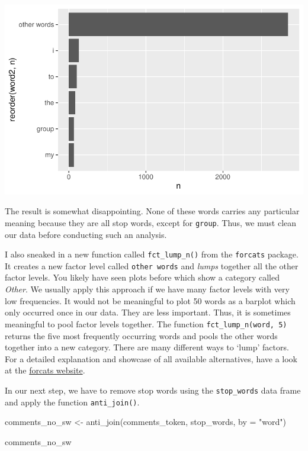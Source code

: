 \documentclass[
  letterpaper,
  DIV=11,
  numbers=noendperiod]{scrreprt}
\newenvironment{Shaded}{\begin{snugshade}}{\end{snugshade}}
\newcommand{\AttributeTok}[1]{\textcolor[rgb]{0.40,0.45,0.13}{#1}}
\newcommand{\FunctionTok}[1]{\textcolor[rgb]{0.28,0.35,0.67}{#1}}
\newcommand{\NormalTok}[1]{\textcolor[rgb]{0.00,0.23,0.31}{#1}}
\newcommand{\OtherTok}[1]{\textcolor[rgb]{0.00,0.23,0.31}{#1}}
\newcommand{\StringTok}[1]{\textcolor[rgb]{0.13,0.47,0.30}{#1}}
\begin{document}
\includegraphics{14_mixed_methods_files/figure-pdf/freq-words-before-stopwords-removal-1.pdf}

The result is somewhat disappointing. None of these words carries any
particular meaning because they are all stop words, except for
\texttt{group}. Thus, we must clean our data before conducting such an
analysis.

I also sneaked in a new function called \texttt{fct\_lump\_n()} from the
\texttt{forcats} package. It creates a new factor level called
\texttt{other\ words} and \emph{lumps} together all the other factor
levels. You likely have seen plots before which show a category called
\emph{Other}. We usually apply this approach if we have many factor
levels with very low frequencies. It would not be meaningful to plot 50
words as a barplot which only occurred once in our data. They are less
important. Thus, it is sometimes meaningful to pool factor levels
together. The function \texttt{fct\_lump\_n(word,\ 5)} returns the five
most frequently occurring words and pools the other words together into
a new category. There are many different ways to `lump' factors. For a
detailed explanation and showcase of all available alternatives, have a
look at the
\href{https://forcats.tidyverse.org/reference/fct_lump.html}{forcats
website}.

In our next step, we have to remove stop words using the
\texttt{stop\_words} data frame and apply the function
\texttt{anti\_join()}.

\begin{Shaded}
\begin{Highlighting}[]
\NormalTok{comments\_no\_sw }\OtherTok{\textless{}{-}} \FunctionTok{anti\_join}\NormalTok{(comments\_token, stop\_words,}
                          \AttributeTok{by =} \StringTok{"word"}\NormalTok{)}

\NormalTok{comments\_no\_sw}
\end{Highlighting}
\end{Shaded}
\end{document}
